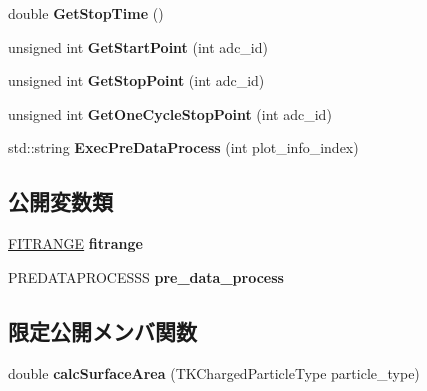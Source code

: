 \begin{DoxyCompactItemize}
double {\bfseries Get\+Stop\+Time} ()
\item 
\mbox{\label{class_t_k_a_n_a_l_y_z_e_aa26fd364fff1d69ead56a53d1d2de439}} 
unsigned int {\bfseries Get\+Start\+Point} (int adc\+\_\+id)
\item 
\mbox{\label{class_t_k_a_n_a_l_y_z_e_a561d27047b90eb3a344a1c86f5290605}} 
unsigned int {\bfseries Get\+Stop\+Point} (int adc\+\_\+id)
\item 
\mbox{\label{class_t_k_a_n_a_l_y_z_e_a607144cda4f6ad2cf472ee792c0aa8a7}} 
unsigned int {\bfseries Get\+One\+Cycle\+Stop\+Point} (int adc\+\_\+id)
\item 
\mbox{\label{class_t_k_a_n_a_l_y_z_e_a5be002cc215145a2af05c85cf50aabe7}} 
std\+::string {\bfseries Exec\+Pre\+Data\+Process} (int plot\+\_\+info\+\_\+index)
\end{DoxyCompactItemize}
\subsection*{公開変数類}
\begin{DoxyCompactItemize}
\item 
\mbox{\label{class_t_k_a_n_a_l_y_z_e_a55e1a2c600ba6fb90f849f04e3dffc0d}} 
\hyperlink{class_t_k_a_n_a_l_y_z_e_1_1_f_i_t_r_a_n_g_e}{F\+I\+T\+R\+A\+N\+GE} {\bfseries fitrange}
\item 
\mbox{\label{class_t_k_a_n_a_l_y_z_e_a924ebf2dbad843a1daf66c85cdfa4b4a}} 
P\+R\+E\+D\+A\+T\+A\+P\+R\+O\+C\+E\+S\+SS {\bfseries pre\+\_\+data\+\_\+process}
\end{DoxyCompactItemize}
\subsection*{限定公開メンバ関数}
\begin{DoxyCompactItemize}
\item 
\mbox{\label{class_t_k_a_n_a_l_y_z_e_ab3051e2a2012e986b33a97a2389b2f47}} 
double {\bfseries calc\+Surface\+Area} (T\+K\+Charged\+Particle\+Type particle\+\_\+type)
\end{DoxyCompactItemize}
